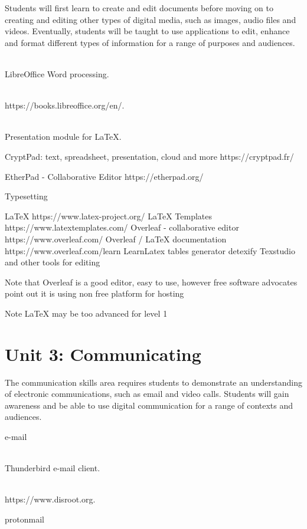 Students will first learn to create and edit documents before moving on to creating and editing other types of digital media, such as images, audio files and videos. Eventually, students will be taught to use applications to edit, enhance and format different types of information for a range of purposes and audiences.

\begin{description}
  \item[LibreOffice-writer] \mbox{}\\ LibreOffice Word processing.
  \item[LibreOffice Documentation] \mbox{}\\ https://books.libreoffice.org/en/.
  \item[LaTex - Beamer] \mbox{}\\ Presentation module for LaTeX.
  \item CryptPad: text, spreadsheet, presentation, cloud and more https://cryptpad.fr/
  \item EtherPad - Collaborative Editor https://etherpad.org/
\end{description}

  Typesetting

    LaTeX https://www.latex-project.org/
        LaTeX Templates https://www.latextemplates.com/
        Overleaf - collaborative editor https://www.overleaf.com/
        Overleaf / LaTeX documentation https://www.overleaf.com/learn
        LearnLatex
        tables generator
        detexify
        Texstudio and other tools for editing
        
        Note that Overleaf is a good editor,  easy to use, however free software advocates point out it is using non free platform for hosting  
        
        Note LaTeX may be too advanced for level 1 


\section{Unit 3: Communicating}

The communication skills area requires students to demonstrate an understanding of electronic communications, such as email and video calls. Students will gain awareness and be able to use digital communication for a range of contexts and audiences.

e-mail

\begin{description}
  \item[Thunderbird] \mbox{}\\ Thunderbird e-mail client.
  \item[Disroot] \mbox{}\\ https://www.disroot.org.
  \item protonmail
\end{description}

